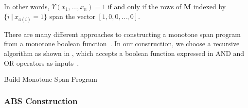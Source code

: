 In other words, $\Upsilon(x_1, \dots, x_n) = 1$ if and only if the rows of $\mathbf{M}$ indexed by $\{i~|~x_{a(i)} = 1 \}$ span the vector $[1, 0, 0, \dots, 0]$.

There are many different approaches to constructing a monotone span program from a monotone boolean function~\cite{Nikov:2004,Liu:2010}.
In our construction, we choose a recursive algorithm as shown in , which accepts a boolean function expressed in AND and OR operators as inputs~\cite{Nikov:2004}.

\begin{algorithm}[t]
  \caption{Build Monotone Span Program}\label{alg:access-control:msp}
\end{algorithm}

\subsubsection{ABS Construction}\label{sec:access-control:abs-cons}
\newcommand{\hash}{\textsf{hash}}

